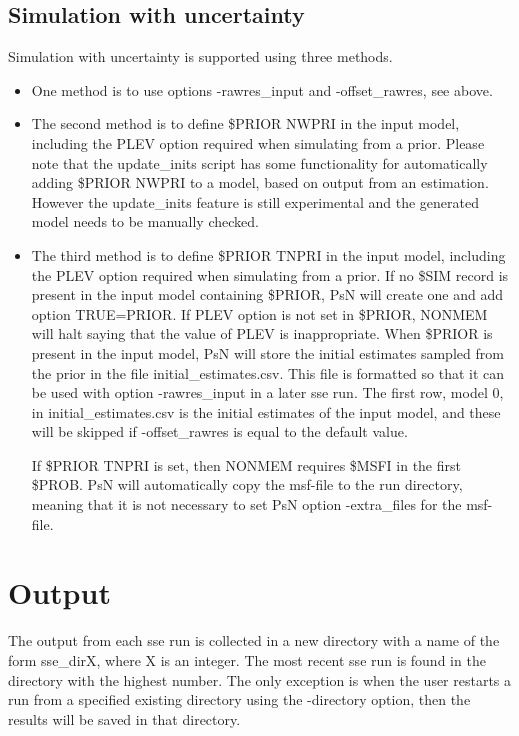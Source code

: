 \subsection{Simulation with uncertainty}
Simulation with uncertainty is supported using three methods. 
\begin{itemize}
	\item One method is to use options -rawres\_input and -offset\_rawres, see above.
	\item The second method is to define \$PRIOR NWPRI in the input model, including the PLEV option required when simulating from a prior. Please note that the update\_inits script has some functionality for automatically adding \$PRIOR NWPRI to a model, based on output from an estimation. However the update\_inits feature is still experimental and the generated model needs to be manually checked.
	\item The third method is to define \$PRIOR TNPRI in the input model, including the PLEV option required when simulating from a prior. If no \$SIM record is present in the input model containing \$PRIOR, PsN will create one and add option TRUE=PRIOR. If PLEV option is not set in \$PRIOR, NONMEM will halt saying that the value of PLEV is inappropriate. When \$PRIOR is present in the input model, PsN will store the initial estimates sampled from the prior in the file initial\_estimates.csv. This file is formatted so that it can be used with option -rawres\_input in a later sse run. The first row, model 0, in initial\_estimates.csv is the initial estimates of the input model, and these will be skipped if -offset\_rawres is equal to the default value.
	
	If \$PRIOR TNPRI is set, then NONMEM requires \$MSFI in the first \$PROB. PsN will automatically copy the msf-file to the run directory, meaning that it is not necessary to set PsN option -extra\_files for the msf-file.
\end{itemize}  


\section{Output}
The output from each sse run is collected in a new directory with a name of the form sse\_dirX, where X is an integer. The most recent sse run is found in the directory with the highest number. The only exception is when the user restarts a run from a specified existing directory using the -directory option, then the results will be saved in that directory. 

